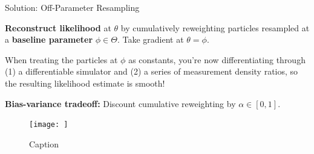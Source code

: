 \documentclass[final]{beamer}
\newcommand{\off}{\operatorname{off}}
\newcommand{\on}{\operatorname{on}}
\newcommand{\gX}{\mathcal{X}}
\newlength{\colwidth}
\begin{document}
\begin{frame}[t]
\begin{columns}[t]
\begin{column}{\colwidth}
  \begin{alertblock}{Solution: Off-Parameter Resampling}

    \textbf{Reconstruct likelihood} at $\theta$ by cumulatively reweighting particles resampled at a \textbf{baseline parameter} $\phi \in \Theta$. Take gradient at $\theta=\phi$.

    When treating the particles at $\phi$ as constants, you're now differentiating through (1) a differentiable simulator and (2) a series of measurement density ratios, so the resulting likelihood estimate is smooth!

    \textbf{Bias-variance tradeoff:} Discount cumulative reweighting by $\alpha \in [0,1]$.

    \begin{figure}
        \centering
        \texttt{[image: ]}
        \caption{Caption}
        \label{fig:enter-label}
    \end{figure}
  \end{alertblock}

    


\end{column}
\end{columns}
\end{frame}
\end{document}
